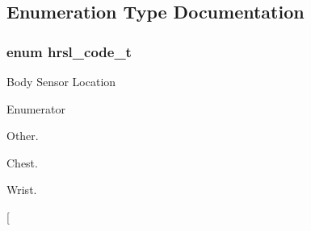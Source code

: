 \subsection{Enumeration Type Documentation}
\hypertarget{group___b_l_e_ga142ef314a313f7071c544be2939c13a3}{
\subsubsection[{hrsl\-\_\-code\-\_\-t}]{\setlength{\rightskip}{0pt plus 5cm}enum {\bf hrsl\-\_\-code\-\_\-t}}}\label{group___b_l_e_ga142ef314a313f7071c544be2939c13a3}
Body Sensor Location \begin{Desc}
\item[Enumerator]\par
\begin{description}
\item[{\em 
\hypertarget{group___b_l_e_gga142ef314a313f7071c544be2939c13a3a1fef127f1d4f2ed5625f5cf201319869}{H\-R\-S\-L\-\_\-\-O\-T\-H\-E\-R}\label{group___b_l_e_gga142ef314a313f7071c544be2939c13a3a1fef127f1d4f2ed5625f5cf201319869}
}]Other. \item[{\em 
\hypertarget{group___b_l_e_gga142ef314a313f7071c544be2939c13a3a6646a23f8ba502cee080a9a747349dae}{H\-R\-S\-L\-\_\-\-C\-H\-E\-S\-T}\label{group___b_l_e_gga142ef314a313f7071c544be2939c13a3a6646a23f8ba502cee080a9a747349dae}
}]Chest. \item[{\em 
\hypertarget{group___b_l_e_gga142ef314a313f7071c544be2939c13a3a69db22e836192e959df20b9d7e322460}{H\-R\-S\-L\-\_\-\-W\-R\-I\-S\-T}\label{group___b_l_e_gga142ef314a313f7071c544be2939c13a3a69db22e836192e959df20b9d7e322460}
}]Wrist. \item[{\em 
}
\end{description}
\end{Desc}
